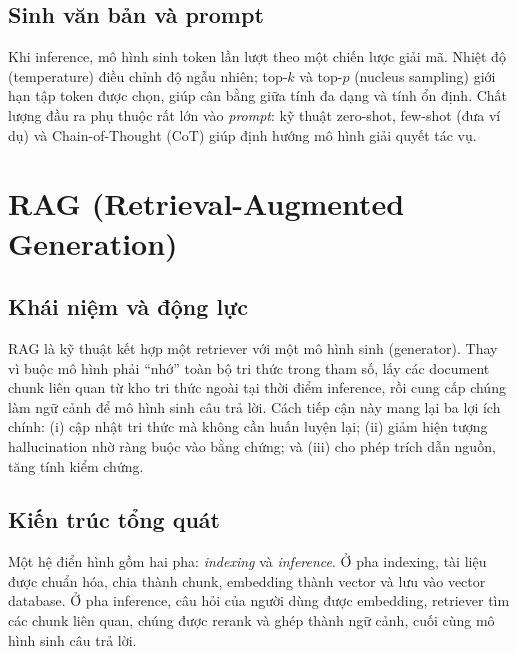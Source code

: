 \subsection{Sinh văn bản và prompt}

Khi inference, mô hình sinh token lần lượt theo một chiến lược giải mã. Nhiệt độ
(temperature) điều chỉnh độ ngẫu nhiên; top-$k$ và top-$p$ (nucleus sampling) giới hạn
tập token được chọn, giúp cân bằng giữa tính đa dạng và tính ổn định. Chất lượng đầu ra
phụ thuộc rất lớn vào \emph{prompt}: kỹ thuật zero-shot, few-shot (đưa ví dụ)
và Chain-of-Thought (CoT) \cite{wei2022cot} giúp định hướng mô hình giải
quyết tác vụ.

\section{RAG (Retrieval-Augmented Generation)}
\label{sec:rag}

\subsection{Khái niệm và động lực}

RAG \cite{lewis2020rag} là kỹ thuật kết hợp một retriever với một mô hình sinh (generator). Thay vì buộc mô hình phải ``nhớ'' toàn bộ
tri thức trong tham số, \rag{} lấy các document chunk liên quan từ kho tri thức ngoài
tại thời điểm inference, rồi cung cấp chúng làm ngữ cảnh để mô hình sinh câu trả lời. Cách
tiếp cận này mang lại ba lợi ích chính: (i) cập nhật tri thức mà không cần huấn luyện lại;
(ii) giảm hiện tượng hallucination nhờ ràng buộc vào bằng chứng; và (iii) cho phép trích dẫn
nguồn, tăng tính kiểm chứng.

\subsection{Kiến trúc tổng quát}

Một hệ \rag{} điển hình gồm hai pha: \emph{indexing} và \emph{inference}.
Ở pha indexing, tài liệu được chuẩn hóa, chia thành chunk, embedding thành vector và
lưu vào vector database. Ở pha inference, câu hỏi của người dùng được embedding, retriever
tìm các chunk liên quan, chúng được rerank và ghép thành ngữ cảnh, cuối cùng mô
hình sinh câu trả lời.

